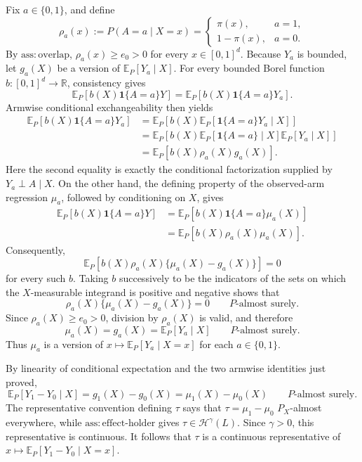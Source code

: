 Fix \(a\in\{0,1\}\), and define
\[
\rho_a(x):=P(A=a\mid X=x)
=
\begin{cases}
\pi(x),&a=1,\\
1-\pi(x),&a=0.
\end{cases}
\]
By \(\mathrm{ass{:}overlap}\), \(\rho_a(x)\ge e_0>0\) for every \(x\in[0,1]^d\). Because \(Y_a\) is bounded, let \(g_a(X)\) be a version of \(\mathbb E_P[Y_a\mid X]\). For every bounded Borel function \(b:[0,1]^d\to\mathbb R\), consistency gives
\[
\mathbb E_P\!\left[b(X)\mathbf 1\{A=a\}Y\right]
=\mathbb E_P\!\left[b(X)\mathbf 1\{A=a\}Y_a\right].
\]
Armwise conditional exchangeability then yields
\[
\begin{aligned}
\mathbb E_P\!\left[b(X)\mathbf 1\{A=a\}Y_a\right]
&=\mathbb E_P\!\left[b(X)\mathbb E_P\!\left[\mathbf 1\{A=a\}Y_a\mid X\right]\right]\\
&=\mathbb E_P\!\left[b(X)\mathbb E_P\!\left[\mathbf 1\{A=a\}\mid X\right]
                         \mathbb E_P\!\left[Y_a\mid X\right]\right]\\
&=\mathbb E_P\!\left[b(X)\rho_a(X)g_a(X)\right].
\end{aligned}
\]
Here the second equality is exactly the conditional factorization supplied by \(Y_a\perp A\mid X\). On the other hand, the defining property of the observed-arm regression \(\mu_a\), followed by conditioning on \(X\), gives
\[
\begin{aligned}
\mathbb E_P\!\left[b(X)\mathbf 1\{A=a\}Y\right]
&=\mathbb E_P\!\left[b(X)\mathbf 1\{A=a\}\mu_a(X)\right]\\
&=\mathbb E_P\!\left[b(X)\rho_a(X)\mu_a(X)\right].
\end{aligned}
\]
Consequently,
\[
\mathbb E_P\!\left[b(X)\rho_a(X)\{\mu_a(X)-g_a(X)\}\right]=0
\]
for every such \(b\). Taking \(b\) successively to be the indicators of the sets on which the \(X\)-measurable integrand is positive and negative shows that
\[
\rho_a(X)\{\mu_a(X)-g_a(X)\}=0
\qquad P\text{-almost surely}.
\]
Since \(\rho_a(X)\ge e_0>0\), division by \(\rho_a(X)\) is valid, and therefore
\[
\mu_a(X)=g_a(X)=\mathbb E_P[Y_a\mid X]
\qquad P\text{-almost surely}.
\]
Thus \(\mu_a\) is a version of \(x\mapsto\mathbb E_P[Y_a\mid X=x]\) for each \(a\in\{0,1\}\).

By linearity of conditional expectation and the two armwise identities just proved,
\[
\mathbb E_P[Y_1-Y_0\mid X]
=g_1(X)-g_0(X)
=\mu_1(X)-\mu_0(X)
\qquad P\text{-almost surely}.
\]
The representative convention defining \(\tau\) says that \(\tau=\mu_1-\mu_0\) \(P_X\)-almost everywhere, while \(\mathrm{ass{:}effect\mbox{-}holder}\) gives \(\tau\in\mathcal H^\gamma(L)\). Since \(\gamma>0\), this representative is continuous. It follows that \(\tau\) is a continuous representative of \(x\mapsto\mathbb E_P[Y_1-Y_0\mid X=x]\).

